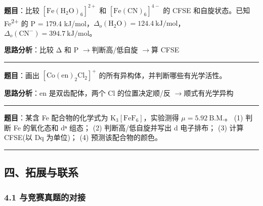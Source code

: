 \documentclass[a4paper,11pt]{ctexart}
\newcommand{\箭}{\ensuremath{\rightarrow}}
\newcommand{\左箭}{\ensuremath{\leftarrow}}
\newcommand{\上箭}{\ensuremath{\uparrow}}
\newcommand{\下箭}{\ensuremath{\downarrow}}
\newcommand{\衡}{\ensuremath{\rightleftharpoons}}
\newcommand{\双箭}{\ensuremath{\leftrightarrow}}
\newcommand{\约等于}{\ensuremath{\approx}}
\newcommand{\小于等于}{\ensuremath{\leq}}
\newcommand{\大于等于}{\ensuremath{\geq}}
\newcommand{\不等于}{\ensuremath{\neq}}
\newcommand{\西格马}{\ensuremath{\sigma}}
\newcommand{\派}{\ensuremath{\pi}}
\begin{document}
\textbf{题目}：比较 \([\mathrm{Fe(H_2O)_6}]^{2+}\) 和 \([\mathrm{Fe(CN)_6}]^{4-}\) 的 CFSE 和自旋状态。已知 Fe\textsuperscript{2+} 的 P = 179.4 kJ/mol，\(\Delta_o(\mathrm{H_2O}) = 124.4\ \mathrm{kJ/mol}\)，\(\Delta_o(\mathrm{CN^-}) = 394.7\ \mathrm{kJ/mol}\)。

\textbf{思路分析}：比较 Δ 和 P \箭 判断高/低自旋 \箭 算 CFSE

\begin{center}\rule{0.5\linewidth}{0.5pt}\end{center}

\textbf{题目}：画出 \([\mathrm{Co(en)_2Cl_2}]^+\) 的所有异构体，并判断哪些有光学活性。

\textbf{思路分析}：en 是双齿配体，两个 Cl 的位置决定顺/反 \箭 顺式有光学异构

\begin{center}\rule{0.5\linewidth}{0.5pt}\end{center}

\textbf{题目}：某含 Fe 配合物的化学式为 \(\mathrm{K_3[FeF_6]}\)，实验测得 \(\mu = 5.92\ \mathrm{B.M.}\)。
(1) 判断 Fe 的氧化态和 dⁿ 组态；
(2) 判断高/低自旋并写出 d 电子排布；
(3) 计算 CFSE(以 Dq 为单位)；
(4) 预测该配合物的颜色。

\begin{center}\rule{0.5\linewidth}{0.5pt}\end{center}

\subsection{四、拓展与联系}\label{ux56dbux62d3ux5c55ux4e0eux8054ux7cfb}

\subsubsection{4.1 与竞赛真题的对接}\label{ux4e0eux7adeux8d5bux771fux9898ux7684ux5bf9ux63a5}
\end{document}
